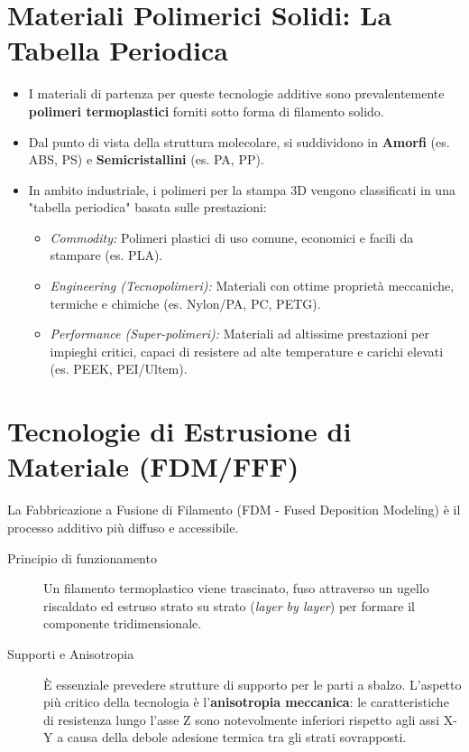 %
\section{Materiali Polimerici Solidi: La Tabella Periodica}
\begin{itemize}
    \item I materiali di partenza per queste tecnologie additive sono prevalentemente \textbf{polimeri termoplastici} forniti sotto forma di filamento solido.
    \item Dal punto di vista della struttura molecolare, si suddividono in \textbf{Amorfi} (es. ABS, PS) e \textbf{Semicristallini} (es. PA, PP).
    \item In ambito industriale, i polimeri per la stampa 3D vengono classificati in una "tabella periodica" basata sulle prestazioni:
          \begin{itemize}
              \item \textit{Commodity:} Polimeri plastici di uso comune, economici e facili da stampare (es. PLA).
              \item \textit{Engineering (Tecnopolimeri):} Materiali con ottime proprietà meccaniche, termiche e chimiche (es. Nylon/PA, PC, PETG).
              \item \textit{Performance (Super-polimeri):} Materiali ad altissime prestazioni per impieghi critici, capaci di resistere ad alte temperature e carichi elevati (es. PEEK, PEI/Ultem).
          \end{itemize}
\end{itemize}

\section{Tecnologie di Estrusione di Materiale (FDM/FFF)}
La Fabbricazione a Fusione di Filamento (FDM - Fused Deposition Modeling) è il processo additivo più diffuso e accessibile.
\begin{description}
    \item [Principio di funzionamento] Un filamento termoplastico viene trascinato, fuso attraverso un ugello riscaldato ed estruso strato su strato (\textit{layer by layer}) per formare il componente tridimensionale.
    \item [Supporti e Anisotropia] È essenziale prevedere strutture di supporto per le parti a sbalzo. L'aspetto più critico della tecnologia è l'\textbf{anisotropia meccanica}: le caratteristiche di resistenza lungo l'asse Z sono notevolmente inferiori rispetto agli assi X-Y a causa della debole adesione termica tra gli strati sovrapposti.
\end{description}

